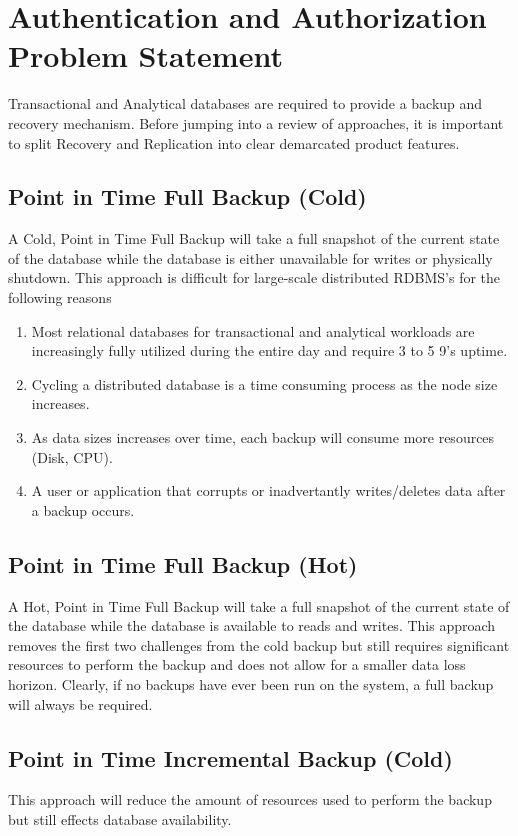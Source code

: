 \section{Authentication and Authorization Problem Statement}
Transactional and Analytical databases are required to provide a backup and
recovery mechanism.  Before jumping into a review of approaches, it is
important to split Recovery and Replication into clear demarcated product
features.

\subsection{Point in Time Full Backup (Cold)}
A Cold, Point in Time Full Backup will take a full snapshot of the current state
of the database while the database is either unavailable for writes or
physically shutdown.  This approach is difficult for large-scale
distributed RDBMS's for the following reasons

\begin{enumerate}
	\item Most relational databases for transactional and analytical workloads are
	increasingly fully utilized during the entire day and require 3 to 5 9's
	uptime.
	\item Cycling a distributed database is a time consuming process
	as the node size increases.
	\item As data sizes increases over time, each backup will consume more
	resources (Disk, CPU).
	\item A user or application that corrupts or inadvertantly writes/deletes data
	after a backup occurs.
\end{enumerate}

\subsection{Point in Time Full Backup (Hot)}
A Hot, Point in Time Full Backup will take a full snapshot of the current state
of the database while the database is available to reads and writes.  This
approach removes the first two challenges from the cold backup but still
requires significant resources to perform the backup and does not allow for a
smaller data loss horizon.  Clearly, if no backups have ever been run on the
system, a full backup will always be required.

\subsection{Point in Time Incremental Backup (Cold)}
This approach will reduce the amount of resources used to perform the backup but
still effects database availability.  

